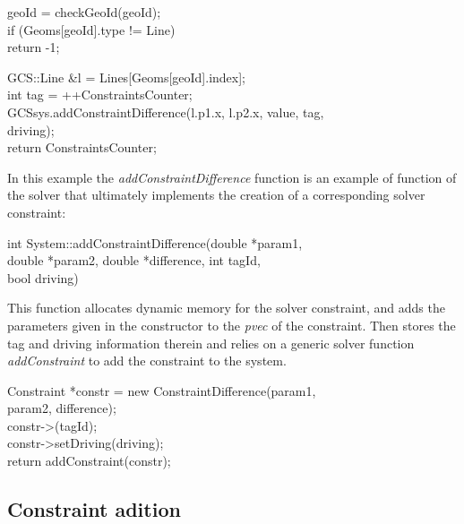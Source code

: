 \documentclass[12pt,twoside,a4paper]{book}
\begin{document}
    \begin{codequote}
    geoId = checkGeoId(geoId);\\

    if (Geoms[geoId].type != Line)\\
    \-\hspace{0.75cm}return -1;

    GCS::Line \&l = Lines[Geoms[geoId].index];\\

    int tag = ++ConstraintsCounter;\\
    GCSsys.addConstraintDifference(l.p1.x, l.p2.x, value, tag,\\
    \-\hspace{0.75cm}driving);\\
    return ConstraintsCounter;
    \end{codequote}

    In this example the \emph{addConstraintDifference} function is an example of function of the solver that ultimately implements the creation of a corresponding solver constraint:

    \begin{codequote}
    int System::addConstraintDifference(double *param1, \\
    \-\hspace{0.75cm}double *param2, double *difference, int tagId,\\
    \-\hspace{0.75cm}bool driving)
    \end{codequote}

    This function allocates dynamic memory for the solver constraint, and adds the parameters given in the constructor to the \emph{pvec} of the constraint. Then stores the tag and driving information therein and relies on a generic solver function \emph{addConstraint} to add the constraint to the system.

    \begin{codequote}
    Constraint *constr = new ConstraintDifference(param1,\\
    \-\hspace{0.75cm}param2, difference);\\
    constr-\textgreater(tagId);\\
    constr-\textgreater{}setDriving(driving);\\
    return addConstraint(constr);
    \end{codequote}


    \subsection{Constraint adition}
\end{document}
